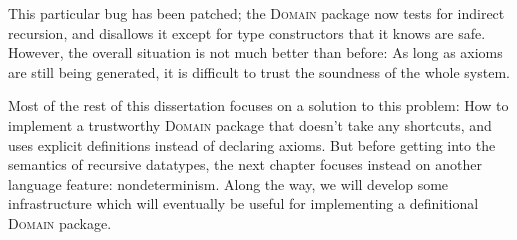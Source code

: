 This particular bug has been patched; the  \textsc{Domain} package now tests for indirect recursion, and disallows it except for type constructors that it knows are safe. However, the overall situation is not much better than before: As long as axioms are still being generated, it is difficult to trust the soundness of the whole system.

Most of the rest of this dissertation focuses on a solution to this problem: How to implement a trustworthy \textsc{Domain} package that doesn't take any shortcuts, and uses explicit definitions instead of declaring axioms. But before getting into the semantics of recursive datatypes, the next chapter focuses instead on another language feature: nondeterminism. Along the way, we will develop some infrastructure which will eventually be useful for implementing a definitional \textsc{Domain} package.
